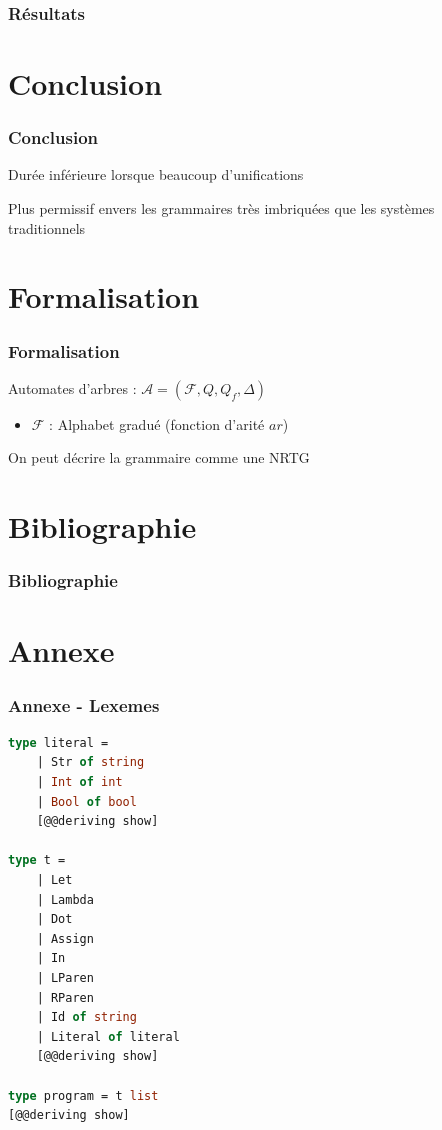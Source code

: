 \documentclass{beamer}
\begin{document}
\begin{frame}
		\frametitle{Résultats}
		\begin{center}
		\end{center}
\end{frame}


\section{Conclusion}
\begin{frame}
		\frametitle{Conclusion}
		\begin{tcolorbox}[title=Bénéfices]
				Durée inférieure lorsque beaucoup d'unifications
		\end{tcolorbox}
		\begin{tcolorbox}
				Plus permissif envers les grammaires très imbriquées que les systèmes traditionnels
		\end{tcolorbox}
\end{frame}

\section{Formalisation}
\begin{frame}
		\frametitle{Formalisation}
		Automates d'arbres : $\mathcal A  = (\mathcal F, Q, Q_f, \Delta)$\\
		\begin{itemize}
				\item{$\mathcal F$ : Alphabet gradué (fonction d'arité $ar$) }
		\end{itemize}
		On peut décrire la grammaire comme une NRTG
\end{frame}

\section{Bibliographie}
\begin{frame}
		\frametitle{Bibliographie}
		\nocite{*}
		\printbibliography
\end{frame}

\section{Annexe}
\begin{frame}[fragile]
		\frametitle{Annexe - Lexemes}
		\begin{lstlisting}[language=ML]
type literal = 
    | Str of string
    | Int of int
    | Bool of bool
    [@@deriving show]

type t =
    | Let
    | Lambda
    | Dot
    | Assign
    | In
    | LParen
    | RParen
    | Id of string
    | Literal of literal
    [@@deriving show]

type program = t list
[@@deriving show]
		\end{lstlisting}
\end{frame}
\end{document}
